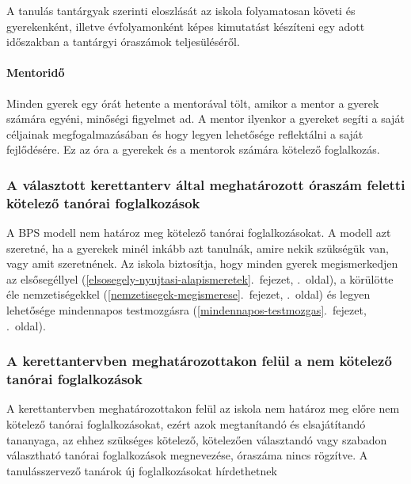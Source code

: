 A tanulás tantárgyak szerinti eloszlását az iskola folyamatosan követi
és gyerekenként, illetve évfolyamonként képes kimutatást készíteni egy
adott időszakban a tantárgyi óraszámok teljesüléséről.

\hypertarget{tantargyakMentorido}{%
\paragraph{Mentoridő}\label{tantargyakMentorido}}

Minden gyerek egy órát hetente a mentorával tölt, amikor a mentor a
gyerek számára egyéni, minőségi figyelmet ad. A mentor ilyenkor a
gyereket segíti a saját céljainak megfogalmazásában és hogy legyen
lehetősége reflektálni a saját fejlődésére. Ez az óra a gyerekek és a
mentorok számára kötelező foglalkozás.

\hypertarget{a-valasztott-kerettanterv-altal-meghatarozott-oraszam-feletti-kotelezo-tanorai-foglalkozasok}{%
\subsubsection{A választott kerettanterv által meghatározott óraszám
feletti kötelező tanórai
foglalkozások}\label{a-valasztott-kerettanterv-altal-meghatarozott-oraszam-feletti-kotelezo-tanorai-foglalkozasok}}

A BPS modell nem határoz meg kötelező tanórai foglalkozásokat. A modell
azt szeretné, ha a gyerekek minél inkább azt tanulnák, amire nekik
szükségük van, vagy amit szeretnének. Az iskola biztosítja, hogy minden
gyerek megismerkedjen az
elsősegéllyel (\ref{elsosegely-nyujtasi-alapismeretek}.~fejezet, \pageref{elsosegely-nyujtasi-alapismeretek}.~oldal),
a körülötte éle
nemzetiségekkel (\ref{nemzetisegek-megismerese}.~fejezet, \pageref{nemzetisegek-megismerese}.~oldal)
és legyen lehetősége
mindennapos testmozgásra (\ref{mindennapos-testmozgas}.~fejezet, \pageref{mindennapos-testmozgas}.~oldal).

\hypertarget{a-kerettantervben-meghatarozottakon-felul-a-nem-kotelezo-tanorai-foglalkozasok}{%
\subsubsection{A kerettantervben meghatározottakon felül a nem kötelező
tanórai
foglalkozások}\label{a-kerettantervben-meghatarozottakon-felul-a-nem-kotelezo-tanorai-foglalkozasok}}

A kerettantervben meghatározottakon felül az iskola nem határoz meg
előre nem kötelező tanórai foglalkozásokat, ezért azok megtanítandó és
elsajátítandó tananyaga, az ehhez szükséges kötelező, kötelezően
választandó vagy szabadon választható tanórai foglalkozások megnevezése,
óraszáma nincs rögzítve. A tanulásszervező tanárok új foglalkozásokat
hírdethetnek


